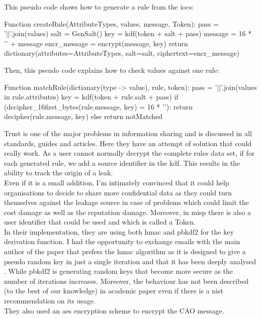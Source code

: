 \documentclass{eplmastersthesis}
\begin{document}
This pseudo code shows how to generate a rule from the \gls{ioc}s:

\begin{center}
\begin{boxedverbatim}
Function createRule(AttributeTypes, values, message, Token):
        pass = '||'.join(values)
        salt = GenSalt()
        key = kdf(token + salt + pass)
        message = 16 * '' + message
        encr_message = encrypt(message, key)
        return dictionary(attributes=AttributeTypes, 
                            salt=salt,
                            ciphertext=encr_message)
\end{boxedverbatim}
\end{center}

Then, this pseudo code explains how to check values against one rule:
\begin{center}
\begin{boxedverbatim}
Function matchRule(dictianary(type -> value), rule, token):
        pass = '||'.join(values in rule.attributes)
        key = kdf(token + rule.salt + pass)
        if (decipher_16first_bytes(rule.message, key) = 16 * ''):
                return decipher(rule.message, key)
        else
                return notMatched
\end{boxedverbatim}
\end{center}


Trust is one of the major problems in information sharing and is discussed in all standards, guides and articles. Here they have an attempt of solution that could really work. As a user cannot normally decrypt the complete rules data set, if for each generated rule, we add a source identifier in the \gls{kdf}. This results in the ability to track the origin of a leak. \\
Even if it is a small addition, I'm intimately convinced that it could help organisations to decide to share more confidential data as they could turn themselves against the leakage source in case of problems which could limit the cost damage as well as the reputation damage. Moreover, in \gls{misp} there is also a user identifier that could be used and which is called a Token.\\

In their implementation, they are using both \gls{hmac} and \gls{pbkdf2} for the key derivation function. I had the opportunity to exchange emails with the main author of the paper that prefers the \gls{hmac} algorithm as it is designed to give a pseudo random key in just a single iteration and that it has been deeply analysed \cite{cryptoeprint}. While \gls{pbkdf2} is generating random keys that become more secure as the number of iterations increases. Moreover, the behaviour has not been described (to the best of our knowledge) in academic paper even if there is a \gls{nist} recommendation on its usage.\\
They also used an \gls{aes} encryption scheme to encrypt the CAO message.\\
\end{document}
